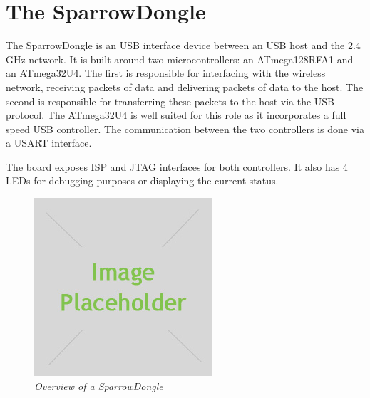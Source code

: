 \section{The SparrowDongle}

The SparrowDongle is an USB interface device between an USB host and the 2.4 GHz
network. It is built around two microcontrollers: an ATmega128RFA1 and an
ATmega32U4. The first is responsible for interfacing with the wireless network,
receiving packets of data and delivering packets of data to the host. The
second is responsible for transferring these packets to the host via the USB
protocol. The ATmega32U4 is well suited for this role as it incorporates a full
speed USB controller. The communication between the two controllers is done via
a USART interface.

The board exposes ISP and JTAG interfaces for both controllers. It also has 4
LEDs for debugging purposes or displaying the current status.

\begin{figure}[ht]
	\begin{center}
		\includegraphics{img/placeholder.jpg}
	\end{center}
	\caption{\small \itshape{Overview of a SparrowDongle}}
\end{figure}

